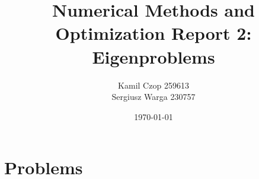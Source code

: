 \documentclass[a4paper]{article}
\title{Numerical Methods and Optimization Report 2: Eigenproblems}
\author{Kamil Czop 259613\\Sergiusz Warga 230757}
\date{\today}
\begin{document}
\maketitle
\tableofcontents
\pagebreak

\section{Problems}





\clearpage

\nocite{GoluVanl96,Zarowski,Zdunek}


\end{document}
